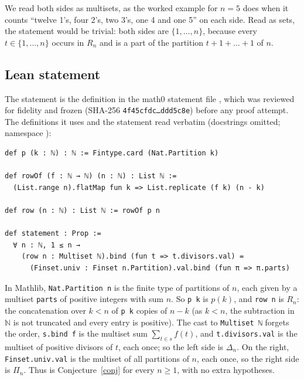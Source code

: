 \documentclass[11pt]{amsart}
\theoremstyle{plain}
\theoremstyle{definition}
\newcommand{\N}{\mathbb{N}}
\begin{document}
We read both sides as multisets, as the worked example for $n=5$ does when it counts ``twelve 1's, four 2's, two 3's, one 4 and one 5'' on each side.
Read as sets, the statement would be trivial: both sides are $\{1,\dots,n\}$, because every $t\in\{1,\dots,n\}$ occurs in $R_n$ and is a part of the partition $t+1+\dots+1$ of $n$.

\subsection*{Lean statement}
The statement is the definition  in the math0 statement file , which was reviewed for fidelity and frozen (SHA-256 \texttt{4f45cfdc\ldots ddd5c8e}) before any proof attempt.
The definitions it uses and the statement read verbatim (docstrings omitted; namespace ):
\begin{lstlisting}
def p (k : ℕ) : ℕ := Fintype.card (Nat.Partition k)

def rowOf (f : ℕ → ℕ) (n : ℕ) : List ℕ :=
  (List.range n).flatMap fun k => List.replicate (f k) (n - k)

def row (n : ℕ) : List ℕ := rowOf p n

def statement : Prop :=
  ∀ n : ℕ, 1 ≤ n →
    (row n : Multiset ℕ).bind (fun t => t.divisors.val) =
      (Finset.univ : Finset n.Partition).val.bind (fun π => π.parts)
\end{lstlisting}
In Mathlib, \texttt{Nat.Partition n} is the finite type of partitions of $n$, each given by a multiset \texttt{parts} of positive integers with sum $n$. So \texttt{p k} is $p(k)$, and \texttt{row n} is $R_n$: the concatenation over $k<n$ of \texttt{p k} copies of $n-k$ (as $k<n$, the subtraction in $\N$ is not truncated and every entry is positive).
The cast to \texttt{Multiset ℕ} forgets the order, \texttt{s.bind f} is the multiset sum $\sum_{t\in s}f(t)$, and \texttt{t.divisors.val} is the multiset of positive divisors of $t$, each once; so the left side is $\Delta_n$.
On the right, \texttt{Finset.univ.val} is the multiset of all partitions of $n$, each once, so the right side is $\Pi_n$.
Thus  is Conjecture~\ref{conj} for every $n\ge1$, with no extra hypotheses.
\end{document}
